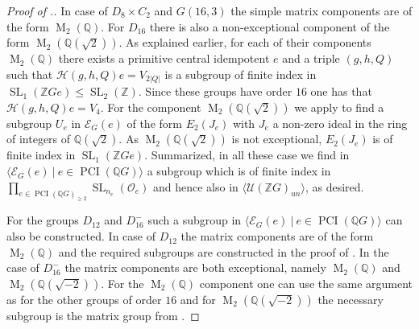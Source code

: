 \documentclass[a4paper,10pt]{amsart}
\theoremstyle{definition}
\theoremstyle{remark}
\newcommand{\SL}{\operatorname{SL}}
\newcommand{\Ma}{\operatorname{M}}
\newcommand\PCI{\operatorname{PCI}}
\renewcommand{\O}{\mathcal{O}}
\newcommand{\U}{{\mathcal U}}
\newcommand\mc{\mathcal}
\newcommand{\Z}{{\mathbb Z}}
\newcommand{\Q}{{\mathbb Q}}
\begin{document}
\begin{proof}[Proof of .]
In case of $D_8 \times C_2$ and $G(16,3)$ the simple matrix components are of the form $\Ma_2(\Q)$. For $D_{16}$ there is also a non-exceptional component of the form $\Ma_2(\Q(\sqrt{2}))$. As explained earlier, for each of their components $\Ma_2(\Q)$ there exists a primitive central idempotent $e$ and a triple $(g,h,Q)$ such that $\mathcal{H}(g,h,Q)e = V_{2|Q|}$ is a subgroup of finite index in $\SL_1(\Z Ge) \leq \SL_2(\Z)$. Since these groups have order $16$ one has that $\mathcal{H}(g,h,Q)e = V_4.$ For the component $\Ma_2(\Q(\sqrt{2}))$ we apply  to find a subgroup $U_e$ in $\mc{E}_G(e)$ of the form $E_{2}(J_e)$ with $J_e$ a non-zero ideal in the ring of integers of $\Q(\sqrt{2})$. As $\Ma_2(\Q(\sqrt{2}))$ is not exceptional, $E_{2}(J_e)$ is of finite index in $\SL_1(\Z Ge)$. Summarized, in all these case we find in $\langle \mathcal{E}_G(e) \ | \ e \in \PCI(\Q G) \rangle$ a subgroup which is of finite index in $ \prod_{e \in \PCI (\Q G)_{\geq 2}} \SL_{n_e}(\O_e)$ and hence also in $\langle  \U(\Z G)_{un} \rangle$, as desired. 

For the groups $D_{12}$ and $D_{16}^{-}$ such a subgroup in $\langle \mathcal{E}_G(e) \ | \ e \in \PCI(\Q G) \rangle$ can also be constructed. In case of $D_{12}$ the matrix components are of the form $\Ma_2(\Q)$ and the required subgroups are constructed in the proof of \cite[Theorem 2]{Jespers12}. In the case of $D_{16}^{-}$ the matrix components are both exceptional, namely $\Ma_2(\Q)$ and $\Ma_2(\Q(\sqrt{-2}))$. For the $\Ma_2(\Q)$ component one can use the same argument as for the other groups of order $16$ and for $\Ma_2(\Q(\sqrt{-2}))$ the necessary subgroup is the matrix group from \cite[Theorem 2]{JesParm}.
\end{proof}  
\end{document}
